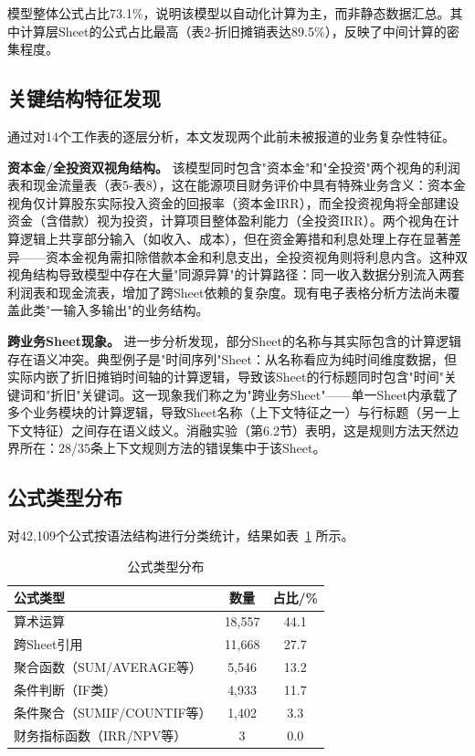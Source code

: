 模型整体公式占比73.1\%，说明该模型以自动化计算为主，而非静态数据汇总。其中计算层Sheet的公式占比最高（表2-折旧摊销表达89.5\%），反映了中间计算的密集程度。

\subsection{\heiti 关键结构特征发现}

通过对14个工作表的逐层分析，本文发现两个此前未被报道的业务复杂性特征。

\textbf{资本金/全投资双视角结构。} 该模型同时包含"资本金"和"全投资"两个视角的利润表和现金流量表（表5-表8），这在能源项目财务评价中具有特殊业务含义：资本金视角仅计算股东实际投入资金的回报率（资本金IRR），而全投资视角将全部建设资金（含借款）视为投资，计算项目整体盈利能力（全投资IRR）。两个视角在计算逻辑上共享部分输入（如收入、成本），但在资金筹措和利息处理上存在显著差异——资本金视角需扣除借款本金和利息支出，全投资视角则将利息内含。这种双视角结构导致模型中存在大量"同源异算"的计算路径：同一收入数据分别流入两套利润表和现金流表，增加了跨Sheet依赖的复杂度。现有电子表格分析方法尚未覆盖此类"一输入多输出"的业务结构。

\textbf{跨业务Sheet现象。} 进一步分析发现，部分Sheet的名称与其实际包含的计算逻辑存在语义冲突。典型例子是"时间序列"Sheet：从名称看应为纯时间维度数据，但实际内嵌了折旧摊销时间轴的计算逻辑，导致该Sheet的行标题同时包含"时间"关键词和"折旧"关键词。这一现象我们称之为"跨业务Sheet"——单一Sheet内承载了多个业务模块的计算逻辑，导致Sheet名称（上下文特征之一）与行标题（另一上下文特征）之间存在语义歧义。消融实验（第6.2节）表明，这是规则方法天然边界所在：28/35条上下文规则方法的错误集中于该Sheet。

\subsection{\heiti 公式类型分布}

对42,109个公式按语法结构进行分类统计，结果如表~\ref{tab:formula_dist} 所示。

\begin{table}[H]
	\centering
	\caption{公式类型分布}
	\label{tab:formula_dist}
	\vspace {-2.5mm}
	\begin{center}
		\begin{tabular}{lcc}
			\toprule
			公式类型 & 数量 & 占比/\% \\
			\hline
			算术运算 & 18,557 & 44.1 \\
			跨Sheet引用 & 11,668 & 27.7 \\
			聚合函数（SUM/AVERAGE等） & 5,546 & 13.2 \\
			条件判断（IF类） & 4,933 & 11.7 \\
			条件聚合（SUMIF/COUNTIF等） & 1,402 & 3.3 \\
			财务指标函数（IRR/NPV等） & 3 & 0.0 \\
			\bottomrule
		\end{tabular}
	\end{center}
\end{table}

